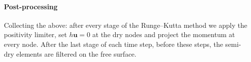 \paragraph{Post-processing}
Collecting the above: after every stage of the Runge--Kutta method we apply the positivity limiter, set $h\mathbf{u} = 0$ at the dry nodes and project the momentum at every node. After the last stage of each time step, before these steps, the semi-dry elements are filtered on the free surface.
